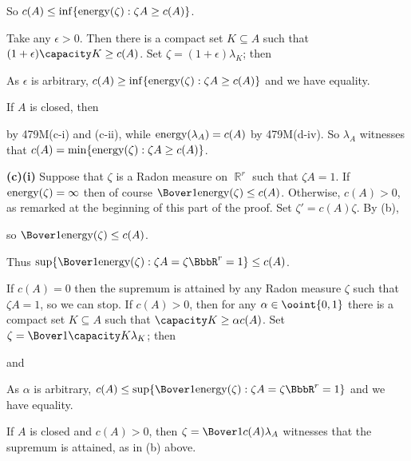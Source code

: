 {So $c(A)\le\inf\{\mathop{\text{energy}}\nolimits(\zeta):\zeta A\ge c(A)\}$.

\medskip

 Take any $\epsilon>0$.
Then there is a compact set $K\subseteq A$ such that
$(1+\epsilon)\capacity K\ge c(A)$.   Set
$\zeta=(1+\epsilon)\lambda_K$;  then


\noindent As $\epsilon$ is arbitrary,
$c(A)\ge\inf\{\mathop{\text{energy}}\nolimits(\zeta):\zeta A\ge c(A)\}$
and we have equality.

\medskip

 If $A$ is closed, then


\noindent by 479M(c-i) and (c-ii), while $\mathop{\text{energy}}\nolimits(\lambda_A)=c(A)$ by
479M(d-iv).   So $\lambda_A$ witnesses that
$c(A)=\min\{\mathop{\text{energy}}\nolimits(\zeta):\zeta A\ge c(A)\}$.

\medskip

{\bf (c)(i)} Suppose that
$\zeta$ is a Radon measure on $\BbbR^r$
such that $\zeta A=1$.   If $\mathop{\text{energy}}\nolimits(\zeta)=\infty$ then of course
$\Bover1{\energy(\zeta)}\le c(A)$.   Otherwise, $c(A)>0$, as
remarked at the beginning of this part of the proof.   Set
$\zeta'=c(A)\zeta$.   By (b),


\noindent so $\Bover1{\energy(\zeta)}\le c(A)$.

Thus $\sup\{\Bover1{\energy(\zeta)}:\zeta A=\zeta\BbbR^r=1\}\le c(A)$.

\medskip

 If $c(A)=0$ then the supremum is attained by any
Radon measure $\zeta$ such that $\zeta A=1$, so we can stop.
If $c(A)>0$, then for any $\alpha\in\ooint{0,1}$ there is a compact set
$K\subseteq A$ such that $\capacity K\ge\alpha c(A)$.   Set
$\zeta=\Bover1{\capacity K}\lambda_K$;  then


\noindent and


\noindent As $\alpha$ is arbitrary,
$c(A)\le\sup\{\Bover1{\energy(\zeta)}:\zeta A=\zeta\BbbR^r=1\}$ and
we have equality.

\medskip

 If $A$ is closed and $c(A)>0$, then
$\zeta=\Bover1{c(A)}\lambda_A$ witnesses that the supremum is
attained, as in (b) above.
}%


